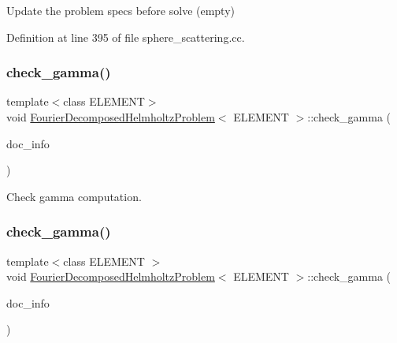 Update the problem specs before solve (empty) 



Definition at line 395 of file sphere\+\_\+scattering.\+cc.

\mbox{\label{classFourierDecomposedHelmholtzProblem_ac4f3f737660b11e8762a61bca999eb0f}} 
\subsubsection{\texorpdfstring{check\+\_\+gamma()}{check\_gamma()}\hspace{0.1cm}{\footnotesize\ttfamily [1/2]}}
{\footnotesize\ttfamily template$<$class E\+L\+E\+M\+E\+NT$>$ \\
void \hyperlink{classFourierDecomposedHelmholtzProblem}{Fourier\+Decomposed\+Helmholtz\+Problem}$<$ E\+L\+E\+M\+E\+NT $>$\+::check\+\_\+gamma (\begin{DoxyParamCaption}\item[{Doc\+Info \&}]{doc\+\_\+info }\end{DoxyParamCaption})}



Check gamma computation. 

\mbox{\label{classFourierDecomposedHelmholtzProblem_ac4f3f737660b11e8762a61bca999eb0f}} 
\subsubsection{\texorpdfstring{check\+\_\+gamma()}{check\_gamma()}\hspace{0.1cm}{\footnotesize\ttfamily [2/2]}}
{\footnotesize\ttfamily template$<$class E\+L\+E\+M\+E\+NT $>$ \\
void \hyperlink{classFourierDecomposedHelmholtzProblem}{Fourier\+Decomposed\+Helmholtz\+Problem}$<$ E\+L\+E\+M\+E\+NT $>$\+::check\+\_\+gamma (\begin{DoxyParamCaption}\item[{Doc\+Info \&}]{doc\+\_\+info }\end{DoxyParamCaption})}



